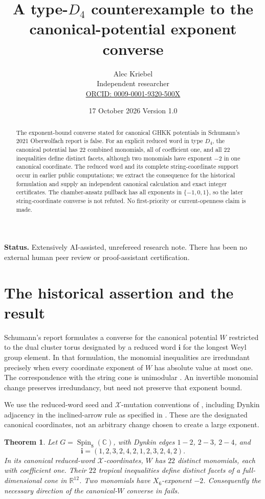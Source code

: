 \documentclass[11pt]{article}
\title{A type-$D_4$ counterexample to the\\canonical-potential exponent converse}
\author{Alec Kriebel\\
\small Independent researcher\\
\small\href{https://orcid.org/0009-0001-9320-500X}{ORCID: 0009-0001-9320-500X}}
\date{17 October 2026 \quad Version 1.0}
\newtheorem{theorem}{Theorem}
\newcommand{\R}{\mathbb R}
\newcommand{\C}{\mathbb C}
\DeclareMathOperator{\Spin}{Spin}
\begin{document}
\maketitle
\begin{abstract}
The exponent-bound converse stated for canonical GHKK potentials in Schumann's
2021 Oberwolfach report is false. For an explicit reduced word in type $D_4$,
the canonical potential has $22$ combined monomials, all of coefficient one,
and all $22$ inequalities define distinct facets, although two monomials have
exponent $-2$ in one canonical coordinate. The reduced word and its complete
string-coordinate support occur in earlier public computations; we extract
the consequence for the historical formulation and supply an independent
canonical calculation and exact integer certificates. The chamber-ansatz
pullback has all exponents in $\{-1,0,1\}$, so the later string-coordinate
converse is not refuted. No first-priority or current-openness claim is made.
\end{abstract}
\noindent\textbf{Status.} Extensively AI-assisted, unrefereed research note.
There has been no external human peer review or proof-assistant certification.

\section{The historical assertion and the result}
Schumann's report \cite[printed p.~1125]{OWR} formulates a converse for the
canonical potential $W$ restricted to the dual cluster torus designated by
a reduced word $\mathbf i$ for the longest Weyl group element. In that
formulation, the monomial inequalities are irredundant precisely when every
coordinate exponent of $W$ has absolute value at most one. The correspondence
with the string cone is unimodular \cite{GKS,KS}. An invertible monomial
change preserves irredundancy, but need not preserve that exponent bound.

We use the reduced-word seed and $\mathcal X$-mutation conventions of
\cite[Eq.~(3), Defs.~7--9]{KS}, including Dynkin adjacency in the inclined-arrow
rule as specified in \cite[\S4.2.2]{GKS}. These are the designated canonical
coordinates, not an arbitrary change chosen to create a large exponent.

\begin{theorem}\label{thm:main}
Let $G=\Spin_8(\C)$, with Dynkin edges $1\!-\!2$, $2\!-\!3$, $2\!-\!4$, and
\[
 \mathbf i=(1,2,3,2,4,2,1,2,3,2,4,2).
\]
In its canonical reduced-word $\mathcal X$-coordinates, $W$ has $22$ distinct
monomials, each with coefficient one. Their $22$ tropical inequalities define
distinct facets of a full-dimensional cone in $\R^{12}$. Two monomials
have $X_6$-exponent $-2$. Consequently the necessary direction of the
canonical-$W$ converse in \cite{OWR} fails.
\end{theorem}
\end{document}
